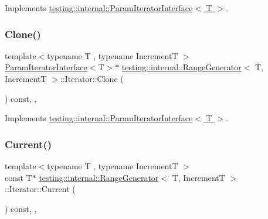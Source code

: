 Implements \hyperlink{classtesting_1_1internal_1_1ParamIteratorInterface_a17500953df75ecda1ace46c08ff731e9}{testing\+::internal\+::\+Param\+Iterator\+Interface$<$ T $>$}.

\mbox{\label{classtesting_1_1internal_1_1RangeGenerator_1_1Iterator_a61a764294b66272d730f5ff5e0acdcf4}} 
\subsubsection{\texorpdfstring{Clone()}{Clone()}}
{\footnotesize\ttfamily template$<$typename T , typename IncrementT $>$ \\
\hyperlink{classtesting_1_1internal_1_1ParamIteratorInterface}{Param\+Iterator\+Interface}$<$T$>$$\ast$ \hyperlink{classtesting_1_1internal_1_1RangeGenerator}{testing\+::internal\+::\+Range\+Generator}$<$ T, IncrementT $>$\+::Iterator\+::\+Clone (\begin{DoxyParamCaption}{ }\end{DoxyParamCaption}) const\hspace{0.3cm}{\ttfamily [inline]}, {\ttfamily [override]}, {\ttfamily [virtual]}}



Implements \hyperlink{classtesting_1_1internal_1_1ParamIteratorInterface_a4998c23e27e2943d97546011aa35db80}{testing\+::internal\+::\+Param\+Iterator\+Interface$<$ T $>$}.

\mbox{\label{classtesting_1_1internal_1_1RangeGenerator_1_1Iterator_acbdfc5919d37fb9514914afb041e50ff}} 
\subsubsection{\texorpdfstring{Current()}{Current()}}
{\footnotesize\ttfamily template$<$typename T , typename IncrementT $>$ \\
const T$\ast$ \hyperlink{classtesting_1_1internal_1_1RangeGenerator}{testing\+::internal\+::\+Range\+Generator}$<$ T, IncrementT $>$\+::Iterator\+::\+Current (\begin{DoxyParamCaption}{ }\end{DoxyParamCaption}) const\hspace{0.3cm}{\ttfamily [inline]}, {\ttfamily [override]}, {\ttfamily [virtual]}}



